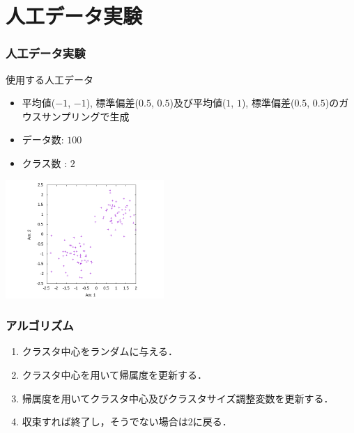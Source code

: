 \documentclass[13pt,dvipdfmx]{beamer}
\begin{document}
\section{人工データ実験}
\begin{frame}\frametitle{人工データ実験}
  \begin{block}{使用する人工データ}
    \begin{itemize}
    \item 平均値($-1$, $-1$), 標準偏差($0.5$, $0.5$)及び平均値($1$, $1$), 標準偏差($0.5$, $0.5$)のガウスサンプリングで生成
    \item データ数: $100$
    \item クラス数 : $2$
    \end{itemize}
    \begin{center}
     \includegraphics[width=60mm]{2d-dat.png}
    \end{center}
  \end{block}
\end{frame}

\begin{frame}\frametitle{アルゴリズム}
  \begin{enumerate}
  \item クラスタ中心をランダムに与える．
  \item クラスタ中心を用いて帰属度を更新する．
  \item 帰属度を用いてクラスタ中心及びクラスタサイズ調整変数を更新する．
  \item 収束すれば終了し，そうでない場合は$2$に戻る．
  \end{enumerate}
\end{frame}
\end{document}
